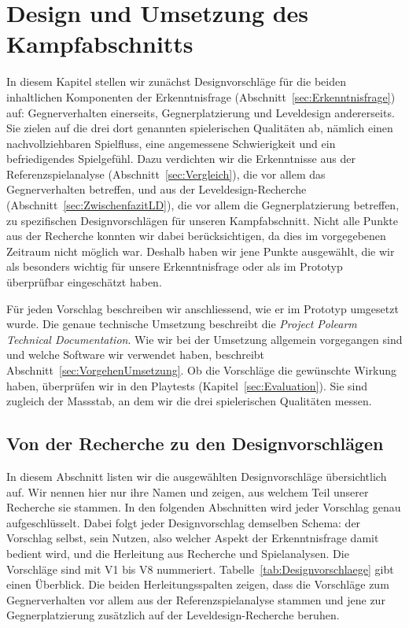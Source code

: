 \documentclass[../Main.tex]{subfiles}
\begin{document}
\section{Design und Umsetzung des Kampfabschnitts} \label{sec:Umsetzung}

In diesem Kapitel stellen wir zunächst Designvorschläge für die beiden inhaltlichen Komponenten der Erkenntnisfrage (Abschnitt~\ref{sec:Erkenntnisfrage}) auf: Gegnerverhalten einerseits, Gegnerplatzierung und Leveldesign andererseits. Sie zielen auf die drei dort genannten spielerischen Qualitäten ab, nämlich einen nachvollziehbaren Spielfluss, eine angemessene Schwierigkeit und ein befriedigendes Spielgefühl. Dazu verdichten wir die Erkenntnisse aus der Referenzspielanalyse (Abschnitt~\ref{sec:Vergleich}), die vor allem das Gegnerverhalten betreffen, und aus der Leveldesign-Recherche (Abschnitt~\ref{sec:ZwischenfazitLD}), die vor allem die Gegnerplatzierung betreffen, zu spezifischen Designvorschlägen für unseren Kampfabschnitt. Nicht alle Punkte aus der Recherche konnten wir dabei berücksichtigen, da dies im vorgegebenen Zeitraum nicht möglich war. Deshalb haben wir jene Punkte ausgewählt, die wir als besonders wichtig für unsere Erkenntnisfrage oder als im Prototyp überprüfbar eingeschätzt haben.

Für jeden Vorschlag beschreiben wir anschliessend, wie er im Prototyp umgesetzt wurde. Die genaue technische Umsetzung beschreibt die \textit{Project Polearm Technical Documentation}. Wie wir bei der Umsetzung allgemein vorgegangen sind und welche Software wir verwendet haben, beschreibt Abschnitt~\ref{sec:VorgehenUmsetzung}. Ob die Vorschläge die gewünschte Wirkung haben, überprüfen wir in den Playtests (Kapitel~\ref{sec:Evaluation}). Sie sind zugleich der Massstab, an dem wir die drei spielerischen Qualitäten messen.

\subsection{Von der Recherche zu den Designvorschlägen} \label{sec:Designvorschlaege}

In diesem Abschnitt listen wir die ausgewählten Designvorschläge übersichtlich auf. Wir nennen hier nur ihre Namen und zeigen, aus welchem Teil unserer Recherche sie stammen. In den folgenden Abschnitten wird jeder Vorschlag genau aufgeschlüsselt. Dabei folgt jeder Designvorschlag demselben Schema: der Vorschlag selbst, sein Nutzen, also welcher Aspekt der Erkenntnisfrage damit bedient wird, und die Herleitung aus Recherche und Spielanalysen. Die Vorschläge sind mit V1 bis V8 nummeriert. Tabelle~\ref{tab:Designvorschlaege} gibt einen Überblick. Die beiden Herleitungsspalten zeigen, dass die Vorschläge zum Gegnerverhalten vor allem aus der Referenzspielanalyse stammen und jene zur Gegnerplatzierung zusätzlich auf der Leveldesign-Recherche beruhen.
\end{document}
